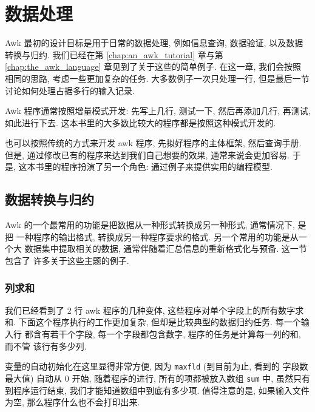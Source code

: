 \chapter{数据处理}
\label{chap:data_processing}

Awk 最初的设计目标是用于日常的数据处理, 例如信息查询, 数据验证, 以及数据
转换与归约. 我们已经在第 \ref{chap:an_awk_tutorial} 章与第
\ref{chap:the_awk_language} 章见到了关于这些的简单例子. 在这一章, 我们会按照
相同的思路, 考虑一些更加复杂的任务. 大多数例子一次只处理一行, 但是最后一节
讨论如何处理占据多行的输入记录.

Awk 程序通常按照增量模式开发: 先写上几行, 测试一下, 然后再添加几行, 再测试,
如此进行下去. 这本书里的大多数比较大的程序都是按照这种模式开发的.

也可以按照传统的方式来开发 awk 程序, 先拟好程序的主体框架, 然后查询手册.
但是, 通过修改已有的程序来达到我们自己想要的效果, 通常来说会更加容易.
于是, 这本书里的程序扮演了另一个角色: 通过例子来提供实用的编程模型.

\section{数据转换与归约}
\label{sec:data_transformation_and_reduction}

Awk 的一个最常用的功能是把数据从一种形式转换成另一种形式, 通常情况下, 是把
一种程序的输出格式, 转换成另一种程序要求的格式. 另一个常用的功能是从一个大
数据集中提取相关的数据, 通常伴随着汇总信息的重新格式化与预备. 这一节包含了
许多关于这些主题的例子.

\subsection{列求和}
\label{subsec:Summing_columns}

我们已经看到了 2 行 awk 程序的几种变体, 这些程序对单个字段上的所有数字求和.
下面这个程序执行的工作更加复杂, 但却是比较典型的数据归约任务. 每一个输入行
都含有若干个字段, 每一个字段都包含数字, 程序的任务是计算每一列的和, 而不管
该行有多少列.
变量的自动初始化在这里显得非常方便, 因为 \verb'maxfld' (到目前为止, 看到的
字段数最大值) 自动从 0 开始, 随着程序的进行, 所有的项都被放入数组 \verb'sum'
中, 虽然只有到程序运行结束, 我们才能知道数组中到底有多少项. 值得注意的是,
如果输入文件为空, 那么程序什么也不会打印出来.

